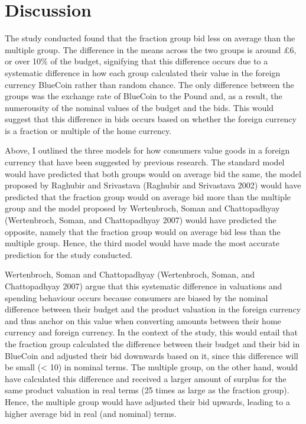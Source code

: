 \documentclass[
]{report}
\begin{document}
\chapter{Discussion}\label{discussion}

The study conducted found that the fraction group bid less on average
than the multiple group. The difference in the means across the two
groups is around £6, or over 10\% of the budget, signifying that this
difference occurs due to a systematic difference in how each group
calculated their value in the foreign currency BlueCoin rather than
random chance. The only difference between the groups was the exchange
rate of BlueCoin to the Pound and, as a result, the numerousity of the
nominal values of the budget and the bids. This would suggest that this
difference in bids occurs based on whether the foreign currency is a
fraction or multiple of the home currency.

Above, I outlined the three models for how consumers value goods in a
foreign currency that have been suggested by previous research. The
standard model would have predicted that both groups would on average
bid the same, the model proposed by Raghubir and Srivastava (Raghubir
and Srivastava 2002) would have predicted that the fraction group would
on average bid more than the multiple group and the model proposed by
Wertenbroch, Soman and Chattopadhyay (Wertenbroch, Soman, and
Chattopadhyay 2007) would have predicted the opposite, namely that the
fraction group would on average bid less than the multiple group. Hence,
the third model would have made the most accurate prediction for the
study conducted.

Wertenbroch, Soman and Chattopadhyay (Wertenbroch, Soman, and
Chattopadhyay 2007) argue that this systematic difference in valuations
and spending behaviour occurs because consumers are biased by the
nominal difference between their budget and the product valuation in the
foreign currency and thus anchor on this value when converting amounts
between their home currency and foreign currency. In the context of the
study, this would entail that the fraction group calculated the
difference between their budget and their bid in BlueCoin and adjusted
their bid downwards based on it, since this difference will be small
(\textless{} 10) in nominal terms. The multiple group, on the other
hand, would have calculated this difference and received a larger amount
of surplus for the same product valuation in real terms (25 times as
large as the fraction group). Hence, the multiple group would have
adjusted their bid upwards, leading to a higher average bid in real (and
nominal) terms.
\end{document}
